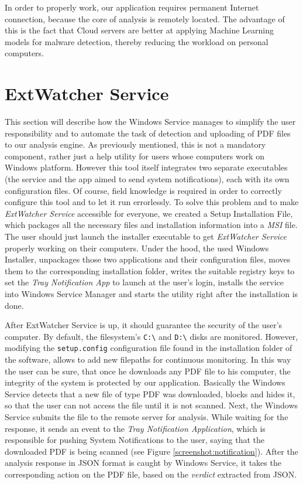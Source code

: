 In order to properly work, our application requires permanent Internet connection, because the core of analysis is remotely located. The advantage of this is the fact that Cloud servers are better at applying Machine Learning models for malware detection, thereby reducing the workload on personal computers. 


\section{ExtWatcher Service}
\label{section:winService}
This section will describe how the Windows Service manages to simplify the user responsibility and to automate the task of detection and uploading of PDF files to our analysis engine. As previously mentioned, this is not a mandatory component, rather just a help utility for users whose computers work on Windows platform. However this tool itself integrates two separate executables (the service and the app aimed to send system notifications), each with its own configuration files. Of course, field knowledge is required in order to correctly configure this tool and to let it run errorlessly. To solve this problem and to make \textit{ExtWatcher Service} accessible for everyone, we created a Setup Installation File, which packages all the necessary files and installation information into a \textit{MSI} file. The user should just launch the installer executable to get \textit{ExtWatcher Service} properly working on their computers. Under the hood, the used Windows Installer, unpackages those two applications and their configuration files, moves them to the corresponding installation folder, writes the suitable registry keys to set the \textit{Tray Notification App} to launch at the user's login, installs the service into Windows Service Manager and starts the utility right after the installation is done. \par
After ExtWatcher Service is up, it should guarantee the security of the user's computer. By default, the filesystem's \texttt{C:\textbackslash} and \texttt{D:\textbackslash} disks are monitored. However, modifying the \texttt{setup.config} configuration file found in the installation folder of the software, allows to add new filepaths for continuous monitoring. In this way the user can be sure, that once he downloads any PDF file to his computer, the integrity of the system is protected by our application. Basically the Windows Service detects that a new file of type PDF was downloaded, blocks and hides it, so that the user can not access the file until it is not scanned. Next, the Windows Service submits the file to the remote server for analysis. While waiting for the response, it sends an event to the \textit{Tray Notification Application}, which is responsible for pushing System Notifications to the user, saying that the downloaded PDF is being scanned (see Figure \ref{screenshot:notification}). After the analysis response in JSON format is caught by Windows Service, it takes the corresponding action on the PDF file, based on the \textit{verdict} extracted from JSON. 

